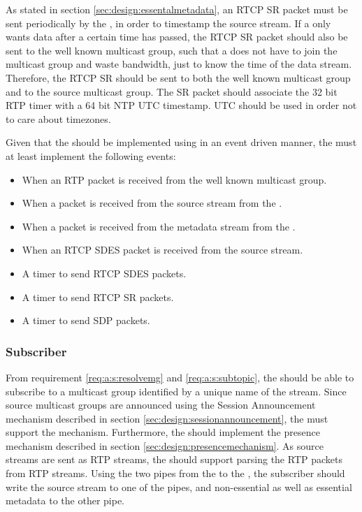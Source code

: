 As stated in section \ref{sec:design:essentalmetadata}, an RTCP SR packet must be sent periodically by the \pub{}, in order to timestamp the source stream. If a \sub{} only wants data after a certain time has passed, the RTCP SR packet should also be sent to the well known multicast group, such that a \sub{} does not have to join the multicast group and waste bandwidth, just to know the time of the data stream. Therefore, the RTCP SR should be sent to both the well known multicast group and to the source multicast group.
The SR packet should associate the 32 bit RTP timer with a 64 bit NTP \ac{UTC} timestamp. \ac{UTC} should be used in order not to care about timezones.

Given that the \pub{} should be implemented using in an event driven manner, the \pub{} must at least implement the following events:

\begin{itemize}
	\item When an RTP packet is received from the well known multicast group.
	\item When a packet is received from the source stream from the \pro{}.
	\item When a packet is received from the metadata stream from the \pro{}.
	\item When an RTCP SDES packet is received from the source stream.
	\item A timer to send RTCP SDES packets.
	\item A timer to send RTCP SR packets.
	\item A timer to send SDP packets.
\end{itemize}

\subsubsection{Subscriber} \label{sec:design:subscriber}
From requirement \ref{req:a:s:resolvemg} and \ref{req:a:s:subtopic}, the \sub{} should be able to subscribe to a multicast group identified by a unique name of the stream. Since source multicast groups are announced using the Session Announcement mechanism described in section \ref{sec:design:sessionannouncement}, the \sub{} must support the mechanism. Furthermore, the \sub{} should implement the presence mechanism described in section \ref{sec:design:presencemechanism}. As source streams are sent as RTP streams, the \sub{} should support parsing the RTP packets from RTP streams. Using the two pipes from the \sub{} to the \con{}, the subscriber should write the source stream to one of the pipes, and non-essential as well as essential metadata to the other pipe.

